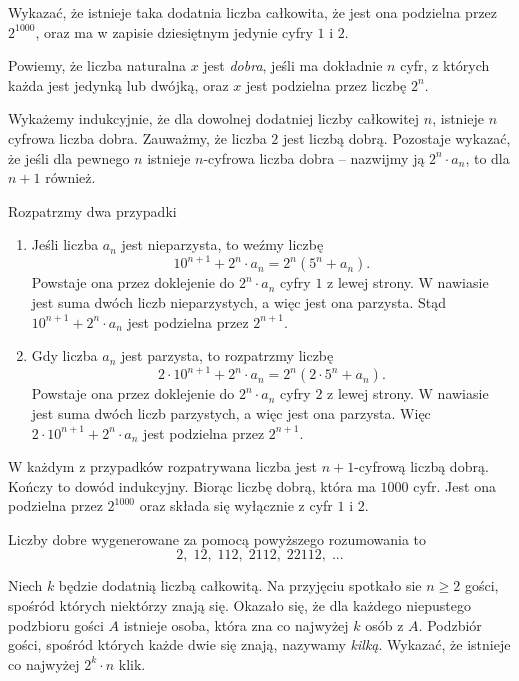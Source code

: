 \begin{problem}{3}
	Wykazać, że istnieje taka dodatnia liczba całkowita, że jest ona podzielna przez $2^{1000}$, oraz ma w zapisie dziesiętnym jedynie cyfry $1$ i $2$.
\end{problem}

\noindent
Powiemy, że liczba naturalna $x$ jest \textit{dobra}, jeśli ma dokładnie $n$ cyfr, z których każda jest jedynką lub dwójką, oraz $x$ jest podzielna przez liczbę $2^n$. 

\vspace{5px}
\noindent
Wykażemy indukcyjnie, że dla dowolnej dodatniej liczby całkowitej $n$, istnieje $n$ cyfrowa liczba dobra. Zauważmy, że liczba $2$ jest liczbą dobrą. Pozostaje wykazać, że jeśli dla pewnego $n$ istnieje $n$-cyfrowa liczba dobra -- nazwijmy ją $2^n \cdot a_n$, to dla $n + 1$ również.

\vspace{5px}
\noindent
Rozpatrzmy dwa przypadki
\begin{enumerate}
	\item Jeśli liczba $a_n$ jest nieparzysta, to weźmy liczbę 
	\[
		10^{n + 1} + 2^n \cdot a_n = 2^n\left(5^n + a_n\right).
	\]
	Powstaje ona przez doklejenie do $2^n \cdot a_n$ cyfry $1$ z lewej strony.
	W nawiasie jest suma dwóch liczb nieparzystych, a więc jest ona parzysta. Stąd $10^{n + 1} + 2^n \cdot a_n $ jest podzielna przez $2^{n + 1}$.
	\item Gdy liczba $a_n$ jest parzysta, to rozpatrzmy liczbę 
	\[
		2 \cdot 10^{n + 1} + 2^n \cdot a_n = 2^n\left(2 \cdot 5^n + a_n\right).
	\]
	Powstaje ona przez doklejenie do $2^n \cdot a_n$ cyfry $2$ z lewej strony.
	W nawiasie jest suma dwóch liczb parzystych, a więc jest ona parzysta. Więc $2 \cdot 10^{n + 1} + 2^n \cdot a_n $ jest podzielna przez $2^{n + 1}$.
\end{enumerate}
W każdym z przypadków rozpatrywana liczba jest $n + 1$-cyfrową liczbą dobrą. Kończy to dowód indukcyjny. Biorąc liczbę dobrą, która ma $1000$ cyfr. Jest ona podzielna przez $2^{1000}$ oraz składa się wyłącznie z cyfr $1$ i $2$.

\begin{remark}
	Liczby dobre wygenerowane za pomocą powyższego rozumowania to
	\[
		2, \; 12, \; 112, \; 2112, \; 22112, \; ...
	\]
\end{remark}

\begin{problem}{4}
	Niech $k$ będzie dodatnią liczbą całkowitą. Na przyjęciu spotkało sie $n \geqslant 2$ gości, spośród których niektórzy znają się. Okazało się, że dla każdego niepustego podzbioru gości $A$ istnieje osoba, która zna co najwyżej $k$ osób z $A$. Podzbiór gości, spośród których każde dwie się znają, nazywamy \textit{kilką}. Wykazać, że istnieje co najwyżej $2^k \cdot n$ klik.
\end{problem}

